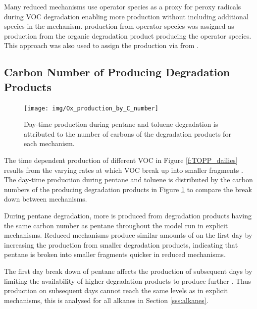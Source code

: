 Many reduced mechanisms use operator species as a proxy for peroxy radicals during VOC degradation enabling more  production without including additional species in the mechanism.
 production from operator species was assigned as  production from the organic degradation product producing the operator species.
This approach was also used to assign the  production via  from .

\subsection[Carbon Number of Ox Producing Degradation Products]{Carbon Number of  Producing Degradation Products} \label{ss:c_number} %

\begin{figure}
    \centering
    \texttt{[image: img/Ox\_production\_by\_C\_number]}
    \vspace{0mm}
    \caption{Day-time  production during pentane and toluene degradation is attributed to the number of carbons of the degradation products for each mechanism.}
    \vspace{-4mm}
    \label{f:carbon}
\end{figure}

The time dependent  production of different VOC in Figure \ref{f:TOPP_dailies} results from the varying rates at which VOC break up into smaller fragments \citep{Butler:2011}.
The day-time  production during pentane and toluene is distributed by the carbon numbers of the  producing degradation products in Figure \ref{f:carbon} to compare the break down between mechanisms.

During pentane degradation, more  is produced from degradation products having the same carbon number as pentane throughout the model run in explicit mechanisms.
Reduced mechanisms produce similar amounts of  on the first day by increasing the  production from smaller degradation products, indicating that pentane is broken into smaller fragments quicker in reduced mechanisms.  

The first day break down of pentane affects the  production of subsequent days by limiting the availability of higher degradation products to produce further .
Thus  production on subsequent days cannot reach the same levels as in explicit mechanisms, this is analysed for all alkanes in Section \ref{sss:alkanes}.

